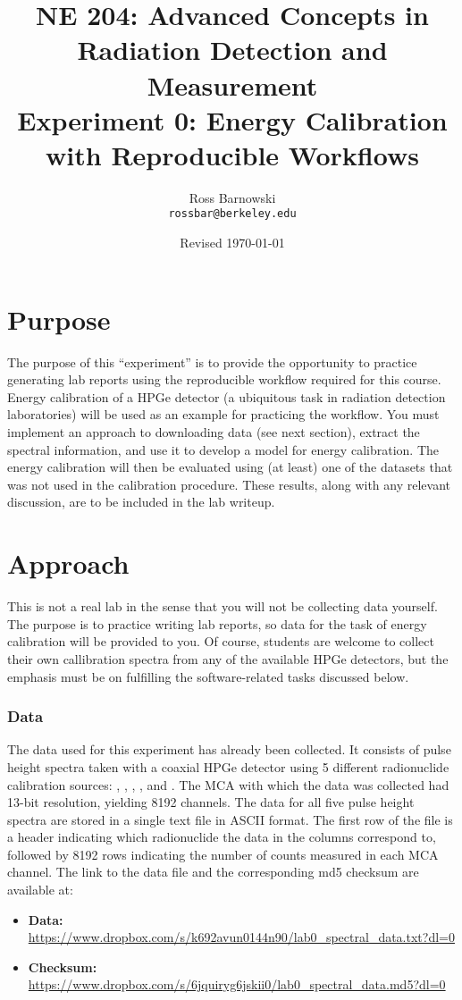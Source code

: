 \documentclass[11pt]{article}
\title{%
       NE 204: Advanced Concepts in Radiation Detection and \\ Measurement \\
       \Large\bf Experiment 0: Energy Calibration with Reproducible Workflows}
\author{Ross Barnowski \\ {\tt rossbar@berkeley.edu}}
\date{Revised \today}
\begin{document}
\maketitle

\section*{Purpose}

The purpose of this ``experiment'' is to provide the opportunity to practice 
generating lab reports using the reproducible workflow required for this
course. 
Energy calibration of a HPGe detector (a ubiquitous task in radiation detection
laboratories) will be used as an example for practicing the workflow.
You must implement an approach to downloading data (see next section), 
extract the spectral information, and use it to develop a model for energy 
calibration. 
The energy calibration will then be evaluated using (at least) one of the 
datasets that was not used in the calibration procedure.
These results, along with any relevant discussion, are to be included in the
lab writeup.

\section*{Approach}

This is not a real lab in the sense that you will not be collecting data 
yourself.
The purpose is to practice writing lab reports, so data for the task of
energy calibration will be provided to you.
Of course, students are welcome to collect their own callibration spectra
from any of the available HPGe detectors, but the emphasis must be on 
fulfilling the software-related tasks discussed below.

\subsubsection*{Data}

The data used for this experiment has already been collected.
It consists of pulse height spectra taken with a coaxial HPGe detector using 
5 different radionuclide calibration sources: , ,
, , and .
The MCA with which the data was collected had 13-bit resolution, yielding 8192
channels.
The data for all five pulse height spectra are stored in a single text file in
ASCII format. 
The first row of the file is a header indicating which radionuclide the 
data in the columns correspond to, followed by 8192 rows indicating the number
of counts measured in each MCA channel.
The link to the data file and the corresponding md5 checksum are available at:
\begin{itemize}
  \item {\bf Data:} \url{https://www.dropbox.com/s/k692avun0144n90/lab0_spectral_data.txt?dl=0}
  \item {\bf Checksum:} \url{https://www.dropbox.com/s/6jquiryg6jskii0/lab0_spectral_data.md5?dl=0}
\end{itemize}
\end{document}
